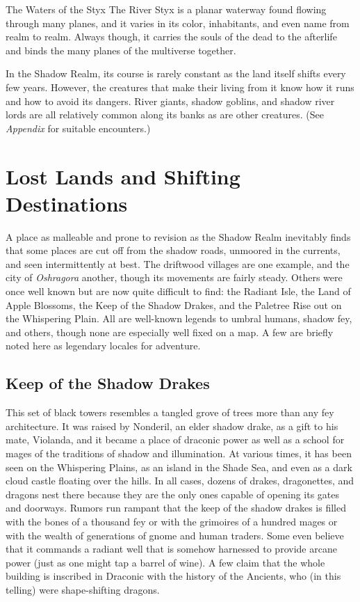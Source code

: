 \documentclass[10pt,a4paper,twoside,bg=print,twocolumn,openany,nodeprecatedcode]{dndbook}
\begin{document}
\begin{DndSidebar}[float=!b]{The Waters of the Styx}
The River Styx is a planar waterway found flowing through many planes, and it varies in its color, inhabitants, and even name from realm to realm. Always though, it carries the souls of the dead to the afterlife and binds the many planes of the multiverse together.



In the Shadow Realm, its course is rarely constant as the land itself shifts every few years. However, the creatures that make their living from it know how it runs and how to avoid its dangers. River giants, shadow goblins, and shadow river lords are all relatively common along its banks as are other creatures. (See \textit{Appendix} for suitable encounters.)



\end{DndSidebar}

\section{Lost Lands and Shifting Destinations}
A place as malleable and prone to revision as the Shadow Realm inevitably finds that some places are cut off from the shadow roads, unmoored in the currents, and seen intermittently at best. The driftwood villages are one example, and the city of \textit{Oshragora} another, though its movements are fairly steady. Others were once well known but are now quite difficult to find: the Radiant Isle, the Land of Apple Blossoms, the Keep of the Shadow Drakes, and the Paletree Rise out on the Whispering Plain. All are well-known legends to umbral humans, shadow fey, and others, though none are especially well fixed on a map. A few are briefly noted here as legendary locales for adventure.

\subsection{Keep of the Shadow Drakes}
This set of black towers resembles a tangled grove of trees more than any fey architecture. It was raised by Nonderil, an elder shadow drake, as a gift to his mate, Violanda, and it became a place of draconic power as well as a school for mages of the traditions of shadow and illumination. At various times, it has been seen on the Whispering Plains, as an island in the Shade Sea, and even as a dark cloud castle floating over the hills. In all cases, dozens of drakes, dragonettes, and dragons nest there because they are the only ones capable of opening its gates and doorways. Rumors run rampant that the keep of the shadow drakes is filled with the bones of a thousand fey or with the grimoires of a hundred mages or with the wealth of generations of gnome and human traders. Some even believe that it commands a radiant well that is somehow harnessed to provide arcane power (just as one might tap a barrel of wine). A few claim that the whole building is inscribed in Draconic with the history of the Ancients, who (in this telling) were shape-shifting dragons.
\end{document}
